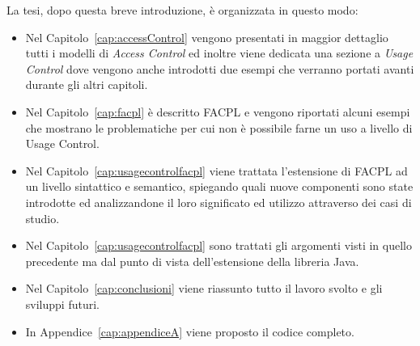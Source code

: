 La tesi, dopo questa breve introduzione, è organizzata in questo modo: 
\begin{itemize}
\item Nel Capitolo~\ref{cap:accessControl} vengono
presentati in maggior dettaglio tutti i modelli di \textit{Access Control} ed inoltre viene dedicata una sezione a \textit{Usage Control}
dove vengono anche introdotti due esempi che verranno portati avanti
durante gli altri capitoli.
\item Nel Capitolo~\ref{cap:facpl} è descritto \ac{FACPL} e vengono riportati alcuni esempi che mostrano le problematiche per cui non è possibile farne un uso a livello di Usage Control.
\item Nel Capitolo~\ref{cap:usagecontrolfacpl} viene trattata l’estensione di FACPL ad un livello sintattico
e semantico, spiegando quali nuove componenti sono state introdotte ed
analizzandone il loro significato ed utilizzo attraverso dei casi di studio.
\item Nel Capitolo~\ref{cap:usagecontrolfacpl} sono trattati gli argomenti
visti in quello precedente ma dal punto di vista dell’estensione della
libreria Java.
\item Nel Capitolo~\ref{cap:conclusioni} viene riassunto tutto il lavoro svolto e gli sviluppi futuri.

\item In Appendice~\ref{cap:appendiceA} viene proposto il codice completo.
\end{itemize}
